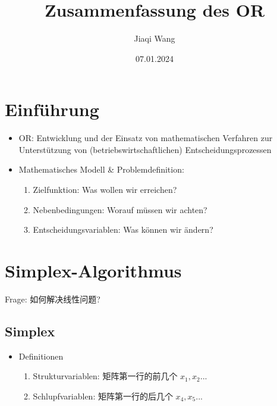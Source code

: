 \documentclass[12pt, letterpaper]{article}
\begin{document}
\begin{CJK*}{UTF8}{gbsn}%

\title{Zusammenfassung des OR}
\author{Jiaqi Wang} %
\date{07.01.2024} %
\maketitle %

\vspace{5cm}

\section{Einführung} %

\begin{itemize}

\item OR: Entwicklung und der Einsatz von mathematischen Verfahren zur Unterstützung von (betriebswirtschaftlichen) Entscheidungsprozessen

\item Mathematisches Modell \& Problemdefinition:
\begin{enumerate}
\item Zielfunktion: Was wollen wir erreichen?
\item Nebenbedingungen: Worauf müssen wir achten?
\item Entscheidungsvariablen: Was können wir ändern?
\end{enumerate}

\end{itemize}

\newpage
\section{Simplex-Algorithmus}
Frage: 如何解决线性问题?
\subsection{Simplex}

\begin{itemize}
\item Definitionen

\begin{enumerate}
\item Strukturvariablen: 矩阵第一行的前几个 $x_1, x_2...$
\item Schlupfvariablen: 矩阵第一行的后几个 $x_4, x_5...$


\end{enumerate}
\end{itemize}
\end{CJK*}
\end{document}
